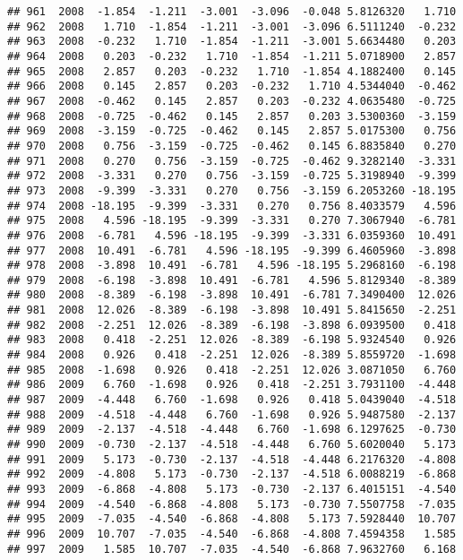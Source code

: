 \documentclass[]{article}
\begin{document}
\begin{verbatim}
## 961  2008  -1.854  -1.211  -3.001  -3.096  -0.048 5.8126320   1.710
## 962  2008   1.710  -1.854  -1.211  -3.001  -3.096 6.5111240  -0.232
## 963  2008  -0.232   1.710  -1.854  -1.211  -3.001 5.6634480   0.203
## 964  2008   0.203  -0.232   1.710  -1.854  -1.211 5.0718900   2.857
## 965  2008   2.857   0.203  -0.232   1.710  -1.854 4.1882400   0.145
## 966  2008   0.145   2.857   0.203  -0.232   1.710 4.5344040  -0.462
## 967  2008  -0.462   0.145   2.857   0.203  -0.232 4.0635480  -0.725
## 968  2008  -0.725  -0.462   0.145   2.857   0.203 3.5300360  -3.159
## 969  2008  -3.159  -0.725  -0.462   0.145   2.857 5.0175300   0.756
## 970  2008   0.756  -3.159  -0.725  -0.462   0.145 6.8835840   0.270
## 971  2008   0.270   0.756  -3.159  -0.725  -0.462 9.3282140  -3.331
## 972  2008  -3.331   0.270   0.756  -3.159  -0.725 5.3198940  -9.399
## 973  2008  -9.399  -3.331   0.270   0.756  -3.159 6.2053260 -18.195
## 974  2008 -18.195  -9.399  -3.331   0.270   0.756 8.4033579   4.596
## 975  2008   4.596 -18.195  -9.399  -3.331   0.270 7.3067940  -6.781
## 976  2008  -6.781   4.596 -18.195  -9.399  -3.331 6.0359360  10.491
## 977  2008  10.491  -6.781   4.596 -18.195  -9.399 6.4605960  -3.898
## 978  2008  -3.898  10.491  -6.781   4.596 -18.195 5.2968160  -6.198
## 979  2008  -6.198  -3.898  10.491  -6.781   4.596 5.8129340  -8.389
## 980  2008  -8.389  -6.198  -3.898  10.491  -6.781 7.3490400  12.026
## 981  2008  12.026  -8.389  -6.198  -3.898  10.491 5.8415650  -2.251
## 982  2008  -2.251  12.026  -8.389  -6.198  -3.898 6.0939500   0.418
## 983  2008   0.418  -2.251  12.026  -8.389  -6.198 5.9324540   0.926
## 984  2008   0.926   0.418  -2.251  12.026  -8.389 5.8559720  -1.698
## 985  2008  -1.698   0.926   0.418  -2.251  12.026 3.0871050   6.760
## 986  2009   6.760  -1.698   0.926   0.418  -2.251 3.7931100  -4.448
## 987  2009  -4.448   6.760  -1.698   0.926   0.418 5.0439040  -4.518
## 988  2009  -4.518  -4.448   6.760  -1.698   0.926 5.9487580  -2.137
## 989  2009  -2.137  -4.518  -4.448   6.760  -1.698 6.1297625  -0.730
## 990  2009  -0.730  -2.137  -4.518  -4.448   6.760 5.6020040   5.173
## 991  2009   5.173  -0.730  -2.137  -4.518  -4.448 6.2176320  -4.808
## 992  2009  -4.808   5.173  -0.730  -2.137  -4.518 6.0088219  -6.868
## 993  2009  -6.868  -4.808   5.173  -0.730  -2.137 6.4015151  -4.540
## 994  2009  -4.540  -6.868  -4.808   5.173  -0.730 7.5507758  -7.035
## 995  2009  -7.035  -4.540  -6.868  -4.808   5.173 7.5928440  10.707
## 996  2009  10.707  -7.035  -4.540  -6.868  -4.808 7.4594358   1.585
## 997  2009   1.585  10.707  -7.035  -4.540  -6.868 7.9632760   6.168

\end{verbatim}
\end{document}
